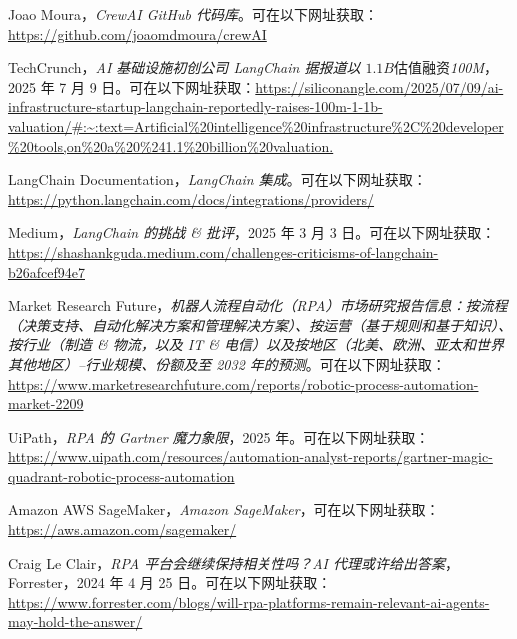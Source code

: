 \documentclass[11pt, a4paper, oneside]{article}
\begin{document}
\begin{thebibliography}{99}
    Joao Moura，\textit{CrewAI GitHub 代码库}。可在以下网址获取：\url{https://github.com/joaomdmoura/crewAI}

    TechCrunch，\textit{AI 基础设施初创公司 LangChain 据报道以 $1.1B 估值融资 $100M}，2025 年 7 月 9 日。可在以下网址获取：\url{https://siliconangle.com/2025/07/09/ai-infrastructure-startup-langchain-reportedly-raises-100m-1-1b-valuation/#:~:text=Artificial%20intelligence%20infrastructure%2C%20developer%20tools,on%20a%20%241.1%20billion%20valuation.}

    LangChain Documentation，\textit{LangChain 集成}。可在以下网址获取：\url{https://python.langchain.com/docs/integrations/providers/}

    Medium，\textit{LangChain 的挑战 \& 批评}，2025 年 3 月 3 日。可在以下网址获取：\url{https://shashankguda.medium.com/challenges-criticisms-of-langchain-b26afcef94e7}

    Market Research Future，\textit{机器人流程自动化（RPA）市场研究报告信息：按流程（决策支持、自动化解决方案和管理解决方案）、按运营（基于规则和基于知识）、按行业（制造 \& 物流，以及 IT \& 电信）以及按地区（北美、欧洲、亚太和世界其他地区）–行业规模、份额及至 2032 年的预测}。可在以下网址获取：\url{https://www.marketresearchfuture.com/reports/robotic-process-automation-market-2209}

    UiPath，\textit{RPA 的 Gartner 魔力象限}，2025 年。可在以下网址获取：
    \url{https://www.uipath.com/resources/automation-analyst-reports/gartner-magic-quadrant-robotic-process-automation}

    Amazon AWS SageMaker，\textit{Amazon SageMaker}，可在以下网址获取：\url{https://aws.amazon.com/sagemaker/}

    Craig Le Clair，\textit{RPA 平台会继续保持相关性吗？AI 代理或许给出答案}，Forrester，2024 年 4 月 25 日。可在以下网址获取：\url{https://www.forrester.com/blogs/will-rpa-platforms-remain-relevant-ai-agents-may-hold-the-answer/}



\end{thebibliography}
\end{document}
